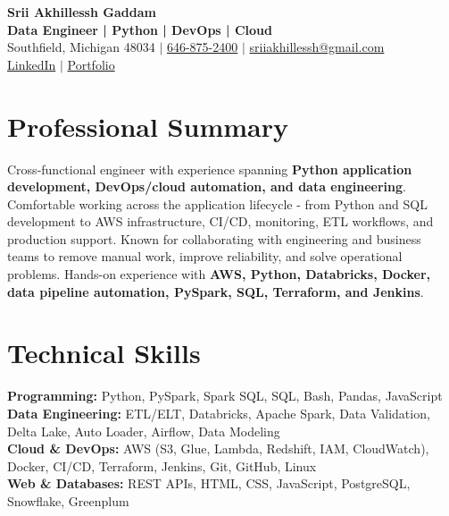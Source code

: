 \documentclass[letterpaper,10pt]{article}
\begin{document}
\fontsize{9.35pt}{10.45pt}\selectfont

\begin{center}
    {\LARGE \textbf{Srii Akhillessh Gaddam}} \\[-1pt]
    \textbf{Data Engineer | Python | DevOps | Cloud} \\[2pt]
    Southfield, Michigan 48034 $|$
    \href{tel:6468752400}{646-875-2400} $|$
    \href{mailto:sriiakhillessh@gmail.com}{sriiakhillessh@gmail.com} \\[1pt]
    \href{https://www.linkedin.com/in/srii-akhiilessh-gaddam-b48668191/}{LinkedIn} $|$
    \href{https://sriiakhillesshg.github.io/portfolio/}{Portfolio}
\end{center}
\vspace{-8pt}

\section{Professional Summary}
\small{Cross-functional engineer with experience spanning \textbf{Python application development, DevOps/cloud automation, and data engineering}. Comfortable working across the application lifecycle - from Python and SQL development to AWS infrastructure, CI/CD, monitoring, ETL workflows, and production support. Known for collaborating with engineering and business teams to remove manual work, improve reliability, and solve operational problems. Hands-on experience with \textbf{AWS, Python, Databricks, Docker, data pipeline automation, PySpark, SQL, Terraform, and Jenkins}.}

\section{Technical Skills}
\small{
\textbf{Programming:} Python, PySpark, Spark SQL, SQL, Bash, Pandas, JavaScript \\
\textbf{Data Engineering:} ETL/ELT, Databricks, Apache Spark, Data Validation, Delta Lake, Auto Loader, Airflow, Data Modeling \\
\textbf{Cloud \& DevOps:} AWS (S3, Glue, Lambda, Redshift, IAM, CloudWatch), Docker, CI/CD, Terraform, Jenkins, Git, GitHub, Linux \\
\textbf{Web \& Databases:} REST APIs, HTML, CSS, JavaScript, PostgreSQL, Snowflake, Greenplum
}

\end{document}
